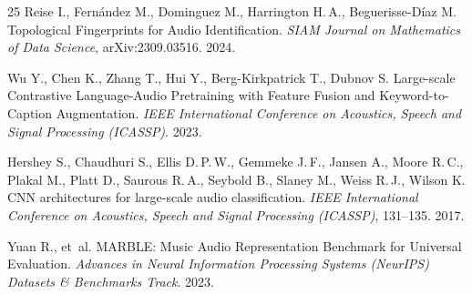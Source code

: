 \begin{thebibliography}{25}
Reise I., Fern{\'a}ndez M., Dominguez M., Harrington H.\,A., Beguerisse-D{\'i}az M.
Topological Fingerprints for Audio Identification.
\textit{SIAM Journal on Mathematics of Data Science}, arXiv:2309.03516. 2024.

Wu Y., Chen K., Zhang T., Hui Y., Berg-Kirkpatrick T., Dubnov S.
Large-scale Contrastive Language-Audio Pretraining with Feature Fusion and Keyword-to-Caption Augmentation.
\textit{IEEE International Conference on Acoustics, Speech and Signal Processing (ICASSP)}. 2023.

Hershey S., Chaudhuri S., Ellis D.\,P.\,W., Gemmeke J.\,F., Jansen A., Moore R.\,C., Plakal M., Platt D., Saurous R.\,A., Seybold B., Slaney M., Weiss R.\,J., Wilson K.
CNN architectures for large-scale audio classification.
\textit{IEEE International Conference on Acoustics, Speech and Signal Processing (ICASSP)}, 131--135. 2017.

Yuan R., et~al.
MARBLE: Music Audio Representation Benchmark for Universal Evaluation.
\textit{Advances in Neural Information Processing Systems (NeurIPS) Datasets \& Benchmarks Track}. 2023.

\end{thebibliography}
